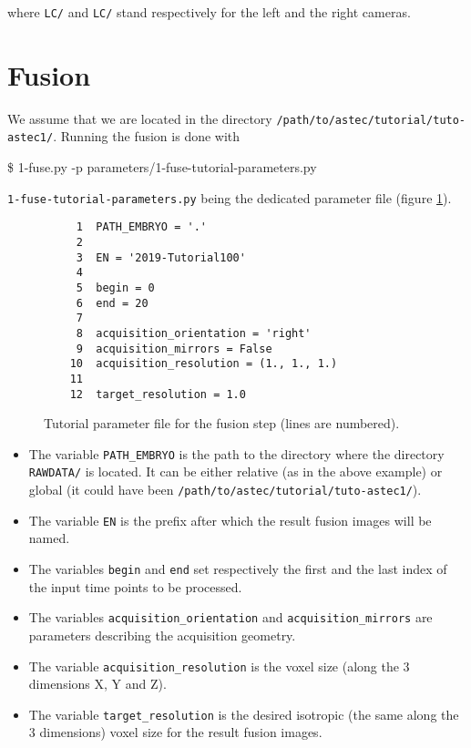where \texttt{LC/} and \texttt{LC/} stand respectively for the left
and the right cameras.





\section{Fusion}
\label{sec:tutorial:fusion}

We assume that we are located in the directory
\texttt{/path/to/astec/tutorial/tuto-astec1/}. Running the fusion is
done with
\begin{code}{0.8}
  \$ 1-fuse.py -p parameters/1-fuse-tutorial-parameters.py
\end{code}
\texttt{1-fuse-tutorial-parameters.py} being the dedicated parameter file  (figure \ref{fig:tutorial:parameter:fusion}).

\begin{figure}
\begin{framed}
\begin{verbatim}
     1	PATH_EMBRYO = '.'
     2	
     3	EN = '2019-Tutorial100'
     4	
     5	begin = 0
     6	end = 20
     7	
     8	acquisition_orientation = 'right'
     9	acquisition_mirrors = False
    10	acquisition_resolution = (1., 1., 1.)
    11	
    12	target_resolution = 1.0
\end{verbatim}
\end{framed}
\caption{\label{fig:tutorial:parameter:fusion} Tutorial parameter file
  for the fusion step (lines are numbered).}
\end{figure}

\begin{itemize}
  \itemsep -1ex
  \item The variable \texttt{PATH\_EMBRYO} is the path to the directory where
    the directory \texttt{RAWDATA/} is located. It can be either relative (as in the
    above example) or
    global (it could have been \texttt{/path/to/astec/tutorial/tuto-astec1/}).
  \item The variable \texttt{EN} is the prefix after which the result fusion images
    will be named. 
  \item The variables \texttt{begin} and \texttt{end} set respectively the
    first and the last index of the input time points to be processed.
  \item The variables \texttt{acquisition\_orientation} and \texttt{acquisition\_mirrors} are parameters
    describing the acquisition geometry.
  \item The variable \texttt{acquisition\_resolution} is the voxel size (along the 3
    dimensions X, Y and Z).
  \item The variable \texttt{target\_resolution} is the desired isotropic (the
    same along the 3 dimensions) voxel size for the result fusion images.
\end{itemize}


